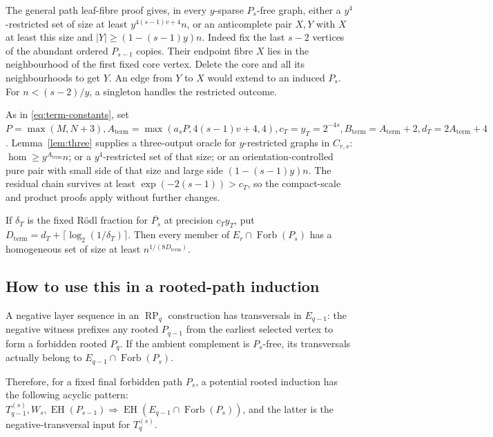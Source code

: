 \documentclass[11pt,a4paper]{article}
\theoremstyle{definition}
\theoremstyle{remark}
\numberwithin{equation}{section}
\begin{document}
The general path leaf-fibre proof gives, in every \(y\)-sparse \(P_{s}\)-free graph, either a \(y^{4}\)-restricted set of size at least \(y^{4(s-1)v+4}n\), or an anticomplete pair \(X,\allowbreak Y\) with \(X\) at least this size and \(|Y|\ge\allowbreak (1-(s-1)y)n\). Indeed fix the last \(s-2\) vertices of the abundant ordered \(P_{s-1}\) copies. Their endpoint fibre \(X\) lies in the neighbourhood of the first fixed core vertex. Delete the core and all its neighbourhoods to get \(Y\). An edge from \(Y\) to \(X\) would extend to an induced \(P_{s}\). For \(n<(s-2)/y\), a singleton handles the restricted outcome.

As in \eqref{eq:term-constants}, set \(P=\max (M,\allowbreak N+3),\allowbreak  A_{\mathrm{term}}=\max (a_{s} P,\allowbreak 4(s-1)v+4,\allowbreak 4),\allowbreak  c_{T}=y_{T}=2^{-4s},\allowbreak  B_{\mathrm{term}}=A_{\mathrm{term}}+2,\allowbreak  d_{T}=2A_{\mathrm{term}}+4\). Lemma~\ref{lem:three} supplies a three-output oracle for \(y\)-restricted graphs in \(C_{r,\allowbreak s}\): \(\hom \ge\allowbreak y^{A_{\mathrm{term}}} n\); or a \(y^{4}\)-restricted set of that size; or an orientation-controlled pure pair with small side of that size and large side \((1-(s-1)y)n\). The residual chain survives at least \(\exp (-2(s-1))>c_{T}\), so the compact-scale and product proofs apply without further changes.

If \(\delta_{T}\) is the fixed R\"odl fraction for \(\overline{P_{s}}\) at precision \(c_{T}y_{T}\), put \(D_{\mathrm{term}}=d_{T}+\lceil \log _{2}(1/\delta_{T})\rceil\). Then every member of \(E_{r} \cap  \operatorname{Forb}(P_{s})\) has a homogeneous set of size at least \(n^{1/(8D_{\mathrm{term}})}\).


\subsection{How to use this in a rooted-path induction}\label{subsec:tail-induction}
A negative layer sequence in an \(\operatorname{RP}_{q}\) construction has transversals in \(E_{q-1}\): the negative witness prefixes any rooted \(P_{q-1}\) from the earliest selected vertex to form a forbidden rooted \(P_{q}\). If the ambient complement is \(P_{s}\)-free, its transversals actually belong to \(E_{q-1} \cap  \operatorname{Forb}(P_{s})\).

Therefore, for a fixed final forbidden path \(P_{s}\), a potential rooted induction has the following acyclic pattern: \(T_{q-1}^{(s)},\allowbreak  W_{s},\allowbreak  \operatorname{EH}(P_{s-1})\Longrightarrow\operatorname{EH}(E_{q-1} \cap  \operatorname{Forb}(P_{s}))\), and the latter is the negative-transversal input for \(T_{q}^{(s)}\).
\end{document}
